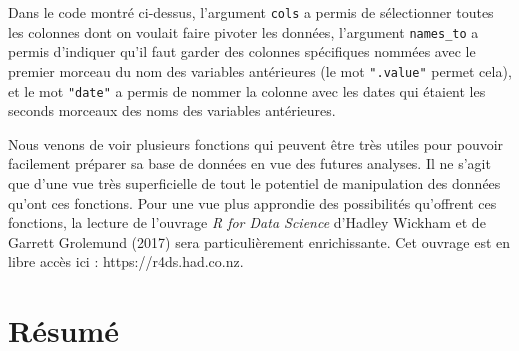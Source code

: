 \documentclass[
  letterpaper,
]{book}
\begin{document}
Dans le code montré ci-dessus, l'argument \texttt{cols} a permis de
sélectionner toutes les colonnes dont on voulait faire pivoter les
données, l'argument \texttt{names\_to} a permis d'indiquer qu'il faut
garder des colonnes spécifiques nommées avec le premier morceau du nom
des variables antérieures (le mot \texttt{".value"} permet cela), et le
mot \texttt{"date"} a permis de nommer la colonne avec les dates qui
étaient les seconds morceaux des noms des variables antérieures.

Nous venons de voir plusieurs fonctions qui peuvent être très utiles
pour pouvoir facilement préparer sa base de données en vue des futures
analyses. Il ne s'agit que d'une vue très superficielle de tout le
potentiel de manipulation des données qu'ont ces fonctions. Pour une vue
plus approndie des possibilités qu'offrent ces fonctions, la lecture de
l'ouvrage \emph{R for Data Science} d'Hadley Wickham et de Garrett
Grolemund (2017) sera particulièrement enrichissante. Cet ouvrage est en
libre accès ici : https://r4ds.had.co.nz.

\section{Résumé}\label{ruxe9sumuxe9-1}
\end{document}
